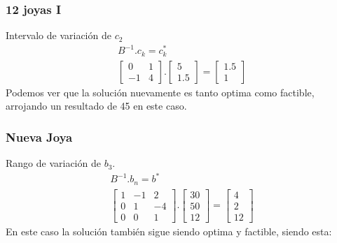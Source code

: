 \begin{homeworkProblem}
\subsubsection{12 joyas \RN{1}}
Intervalo de variación de $c_2$
\begin{align*}
B^{-1}.c_k=c_k^{*}\\
    \begin{bmatrix}
        0 & 1 \\
        -1 & 4
    \end{bmatrix}.
    \begin{bmatrix}
        5 \\
        1.5        
    \end{bmatrix}=
    \begin{bmatrix}
        1.5 \\
        1
    \end{bmatrix}
\end{align*}
Podemos ver que la solución nuevamente es tanto optima como factible, arrojando un resultado de 45 en este caso.

\subsubsection{Nueva Joya}
Rango de variación de $b_3$.
\begin{align*}
    B^{-1}.b_n = b^{*} \\
    \begin{bmatrix}
        1 & -1 & 2 \\
        0 & 1 & -4 \\
        0 & 0 & 1 
    \end{bmatrix}.
    \begin{bmatrix}
        30 \\
        50 \\
        12
    \end{bmatrix}=
    \begin{bmatrix}
        4 \\
        2\\
        12
    \end{bmatrix}
\end{align*}
En este caso la solución también sigue siendo optima y factible, siendo esta:
\end{homeworkProblem}

